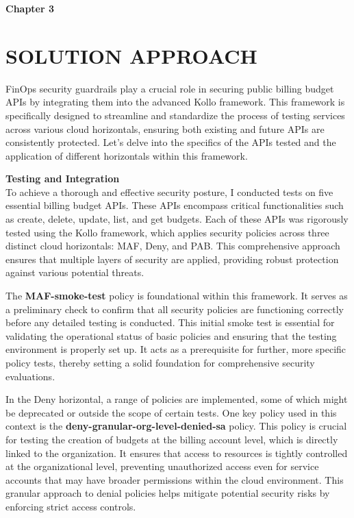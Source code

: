 \newpage
\textbf{\huge Chapter 3} 
\section{SOLUTION APPROACH}
    FinOps security guardrails play a crucial role in securing public billing budget APIs by integrating them into the advanced Kollo framework. This framework is specifically designed to streamline and standardize the process of testing services across various cloud horizontals, ensuring both existing and future APIs are consistently protected. Let’s delve into the specifics of the APIs tested and the application of different horizontals within this framework.

    \textbf{Testing and Integration}\\
    To achieve a thorough and effective security posture, I conducted tests on five essential billing budget APIs. These APIs encompass critical functionalities such as create, delete, update, list, and get budgets. Each of these APIs was rigorously tested using the Kollo framework, which applies security policies across three distinct cloud horizontals: MAF, Deny, and PAB. This comprehensive approach ensures that multiple layers of security are applied, providing robust protection against various potential threats.

    The \textbf{MAF-smoke-test} policy is foundational within this framework. It serves as a preliminary check to confirm that all security policies are functioning correctly before any detailed testing is conducted. This initial smoke test is essential for validating the operational status of basic policies and ensuring that the testing environment is properly set up. It acts as a prerequisite for further, more specific policy tests, thereby setting a solid foundation for comprehensive security evaluations.

    In the Deny horizontal, a range of policies are implemented, some of which might be deprecated or outside the scope of certain tests. One key policy used in this context is the \textbf{deny-granular-org-level-denied-sa} policy. This policy is crucial for testing the creation of budgets at the billing account level, which is directly linked to the organization. It ensures that access to resources is tightly controlled at the organizational level, preventing unauthorized access even for service accounts that may have broader permissions within the cloud environment. This granular approach to denial policies helps mitigate potential security risks by enforcing strict access controls.

